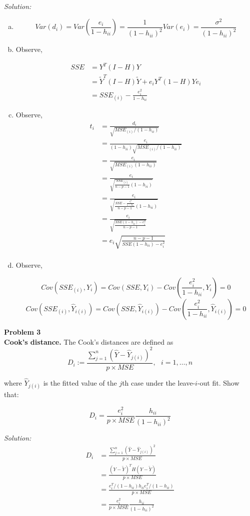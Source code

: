 \documentclass{article}
\newenvironment{problem}[2][Problem]
    { \begin{mdframed}[backgroundcolor=gray!20] \textbf{#1 #2} \\}
    {  \end{mdframed}}
\newenvironment{solution}
    {\textit{Solution:}}
    {}
\begin{document}
\begin{solution}
\begin{enumerate}[(a)]
\item 
$$Var \left (d_i \right) =Var \left (\frac{e_i}{1 - h_{ii}} \right)  = \frac{1}{(1 - h_{ii})^2} Var(e_i) = \frac{\sigma^2}{(1 - h_{ii})^2}$$
\item Observe, 

\begin{align*}
SSE &=  Y^T (I - H)Y \\
&= \tilde Y^T (I - H) \tilde Y + e_i Y^T (1 - H)Y e_i \\
&= SSE_{(i)} - \frac{e_i^2}{1 - h_{ii}}
\end{align*}
\item Observe,
\begin{align*}
t_i &= \frac{d_i}{\sqrt{MSE_{(i)} / (1 - h_{ii})}} \\
&= \frac{e_i}{(1 - h_{ii}) \sqrt{MSE_{(i)} / (1 - h_{ii})}} \\
&=  \frac{e_i}{\sqrt{MSE_{(i)} (1 - h_{ii}) }} \\
&=  \frac{e_i}{\sqrt{\frac{SSE_{(i)}}{n - p - 1} (1 - h_{ii}) }} \\
&=  \frac{e_i}{\sqrt{\frac{SSE - \frac{e_i^2}{1 - h_{ii}}}{n - p - 1} (1 - h_{ii}) }} \\
&=  \frac{e_i}{\sqrt{\frac{SSE(1 - h_{ii}) - e_i^2}{n - p - 1}  }} \\
&=  e_i\sqrt{\frac{n - p - 1}{SSE(1 - h_{ii}) - e_i^2}  } \\
\end{align*}
\item Observe, 

$$Cov(SSE_{(i)}, Y_i) = Cov(SSE, Y_i) - Cov(\frac{e_i^2}{1 - h_{ii}}, Y_i) = 0$$
$$Cov(SSE_{(i)}, \hat Y_{i(i)}) = Cov(SSE, \hat Y_{i(i)}) - Cov(\frac{e_i^2}{1 - h_{ii}}, \hat Y_{i(i)}) = 0$$
\end{enumerate}
\end{solution}

\begin{problem}{3}
\textbf{Cook's distance.} The Cook's distances are defined as
$$D_i := \frac{\sum_{j = 1}^n (\hat Y - \hat Y_{j(i)})^2}{p \times MSE}, \ \ \ i = 1, \ldots, n$$

where $\hat Y_{j(i)}$ is the fitted value of the $j$th case under the leave-$i$-out fit. Show that:

$$D_i = \frac{e_i^2}{p \times MSE} \frac{h_{ii}}{(1 - h_{ii})^2}$$

\end{problem}
\begin{solution}
\begin{align*}
D_i &= \frac{\sum_{j = 1}^n (\hat Y - \hat Y_{j(i)})^2}{p \times MSE}  \\
&= \frac{(Y - \tilde Y)^T H (Y - \tilde Y)}{p \times MSE} \\
&= \frac{ e_i^T/ (1 - h_{ii}) h_{ii} e_i^T/ (1 - h_{ii})}{p \times MSE} \\
&= \frac{ e_i^2 }{p \times MSE}\frac{h_{ii}}{(1 - h_{ii})^2}
\end{align*}
\end{solution}
\end{document}
